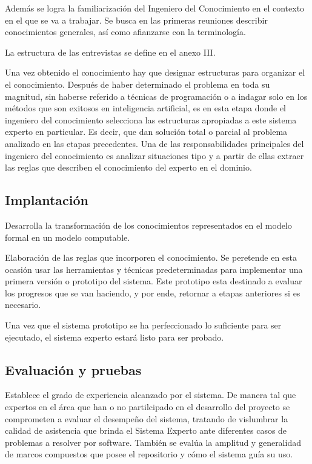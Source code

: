 Además se logra la familiarización del Ingeniero del Conocimiento en el contexto en
 el que se va a trabajar. Se busca en las primeras reuniones describir conocimientos
 generales, así como afianzarse con la terminología.

La estructura de las entrevistas se define en el anexo III.

Una vez obtenido el conocimiento hay que designar estructuras para organizar el
 el conocimiento. Después de haber determinado el problema en toda su magnitud,
 sin haberse referido a técnicas de programación o a indagar solo en los métodos
 que son exitosos en inteligencia artificial, es en esta etapa donde el ingeniero del
 conocimiento selecciona las estructuras apropiadas a este sistema experto en particular.
 Es decir, que dan solución total o parcial al problema analizado en las etapas precedentes.
 Una de las responsabilidades principales del ingeniero del conocimiento es analizar
 situaciones tipo y a partir de ellas extraer las reglas que describen el conocimiento del
 experto en el dominio.


\subsection{Implantación}

Desarrolla la transformación de los conocimientos representados en el modelo formal
 en un modelo computable.

Elaboración de las reglas que incorporen el conocimiento. Se peretende en esta ocasión
 usar las herramientas y técnicas predeterminadas para implementar una primera versión
 o prototipo del sistema. Este prototipo esta destinado a evaluar los progresos que se
 van haciendo, y por ende, retornar a etapas anteriores si es necesario.

Una vez que el sistema prototipo se ha perfeccionado lo suficiente para ser ejecutado,
 el sistema experto estará listo para ser probado.


\subsection{Evaluación y pruebas}

Establece el grado de experiencia alcanzado por el sistema. De manera tal que expertos
 en el área que han o no partilcipado en el desarrollo del proyecto se comprometen a
 evaluar el desempeño del sistema, tratando de vislumbrar la calidad de asistencia que
 brinda el Sistema Experto ante diferentes casos de problemas a resolver por software.
 También se evalúa la amplitud y generalidad de marcos compuestos que posee el repositorio
 y cómo el sistema guía su uso.

